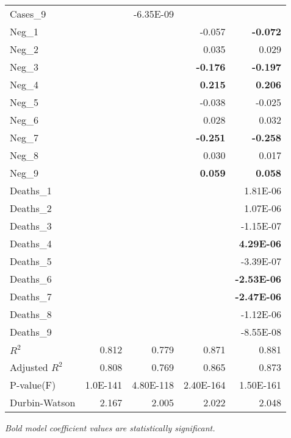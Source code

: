 \begin{longtable}[c]{@{}lrrrr@{}}
Cases\_9 &  & -6.35E-09 &  &  \\
Neg\_1 &  &  & -0.057 & \textbf{-0.072} \\
Neg\_2 &  &  & 0.035 & 0.029 \\
Neg\_3 &  &  & \textbf{-0.176} & \textbf{-0.197} \\
Neg\_4 &  &  & \textbf{0.215} & \textbf{0.206} \\
Neg\_5 &  &  & -0.038 & -0.025 \\
Neg\_6 &  &  & 0.028 & 0.032 \\
Neg\_7 &  &  & \textbf{-0.251} & \textbf{-0.258} \\
Neg\_8 &  &  & 0.030 & 0.017 \\
Neg\_9 &  &  & \textbf{0.059} & \textbf{0.058} \\
Deaths\_1 &  &  &  & 1.81E-06 \\
Deaths\_2 &  &  &  & 1.07E-06 \\
Deaths\_3 &  &  &  & -1.15E-07 \\
Deaths\_4 &  &  &  & \textbf{4.29E-06} \\
Deaths\_5 &  &  &  & -3.39E-07 \\
Deaths\_6 &  &  &  & \textbf{-2.53E-06} \\
Deaths\_7 &  &  &  & \textbf{-2.47E-06} \\
Deaths\_8 &  &  &  & -1.12E-06 \\
Deaths\_9 &  &  &  & -8.55E-08 \\
$R^2$ & 0.812 & 0.779 & 0.871 & 0.881 \\
Adjusted $R^2$ & 0.808 & 0.769 & 0.865 & 0.873 \\
P-value(F) & 1.0E-141 & 4.80E-118 & 2.40E-164 & 1.50E-161 \\
Durbin-Watson & 2.167 & 2.005 & 2.022 & 2.048 \\* \bottomrule
\end{longtable}
\emph{Bold model coefficient values are statistically significant.}




